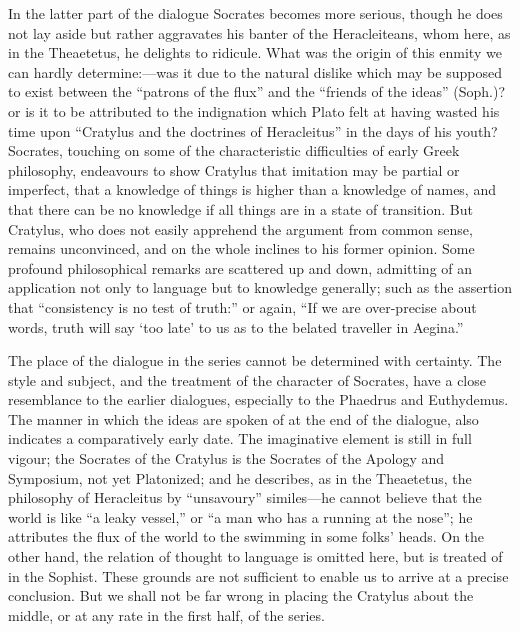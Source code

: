 \documentclass[11pt,letter]{article}
\begin{document}
\par  In the latter part of the dialogue Socrates becomes more serious, though he does not lay aside but rather aggravates his banter of the Heracleiteans, whom here, as in the Theaetetus, he delights to ridicule. What was the origin of this enmity we can hardly determine:—was it due to the natural dislike which may be supposed to exist between the “patrons of the flux” and the “friends of the ideas” (Soph.)? or is it to be attributed to the indignation which Plato felt at having wasted his time upon “Cratylus and the doctrines of Heracleitus” in the days of his youth? Socrates, touching on some of the characteristic difficulties of early Greek philosophy, endeavours to show Cratylus that imitation may be partial or imperfect, that a knowledge of things is higher than a knowledge of names, and that there can be no knowledge if all things are in a state of transition. But Cratylus, who does not easily apprehend the argument from common sense, remains unconvinced, and on the whole inclines to his former opinion. Some profound philosophical remarks are scattered up and down, admitting of an application not only to language but to knowledge generally; such as the assertion that “consistency is no test of truth:” or again, “If we are over-precise about words, truth will say ‘too late’ to us as to the belated traveller in Aegina.”

\par  The place of the dialogue in the series cannot be determined with certainty. The style and subject, and the treatment of the character of Socrates, have a close resemblance to the earlier dialogues, especially to the Phaedrus and Euthydemus. The manner in which the ideas are spoken of at the end of the dialogue, also indicates a comparatively early date. The imaginative element is still in full vigour; the Socrates of the Cratylus is the Socrates of the Apology and Symposium, not yet Platonized; and he describes, as in the Theaetetus, the philosophy of Heracleitus by “unsavoury” similes—he cannot believe that the world is like “a leaky vessel,” or “a man who has a running at the nose”; he attributes the flux of the world to the swimming in some folks’ heads. On the other hand, the relation of thought to language is omitted here, but is treated of in the Sophist. These grounds are not sufficient to enable us to arrive at a precise conclusion. But we shall not be far wrong in placing the Cratylus about the middle, or at any rate in the first half, of the series.
\end{document}

